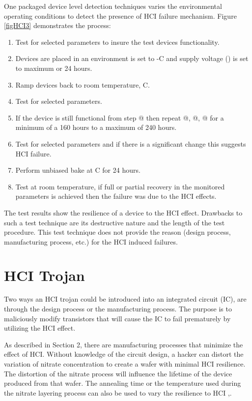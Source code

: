 \documentclass[12pt,conference]{IEEEtran}
\makeatletter
\newcommand{\Rmnum}[1]{\expandafter\@slowromancap\romannumeral #1@}
\makeatother
\begin{document}
One packaged device level detection techniques varies the environmental operating conditions to detect the presence of HCI failure mechanism.  Figure \ref{figHCI3} demonstrates the process: 
\begin{comment}
\newcounter{Lcount}
\begin{list}{\Roman{Lcount}.}
{\usecounter{Lcount}
\setlength{\rightmargin}{\leftmargin}}


\end{comment}
\renewcommand{\labelenumi}{\Roman{enumi}.}
\begin{enumerate}
\item Test for selected parameters to insure the test devices functionality.
\item Devices are placed in an environment is set to -C  and supply voltage () is set to maximum or 24 hours.
\item Ramp devices back to room temperature, C.
\item Test for selected parameters.
\item If the device is still functional from step \Rmnum{5} then repeat \Rmnum{2}, \Rmnum{3}, \Rmnum{4} for a minimum of a 160 hours to a maximum of 240 hours.
\item Test for selected parameters and if there is a significant change this suggests HCI failure.
\item Perform unbiased bake at C for 24 hours.
\item Test at room temperature, if full or partial recovery in the monitored parameters is achieved then the failure was due to the HCI effects. 
\end{enumerate}
 The test results show the resilience of a device to the HCI effect.  Drawbacks to such a test technique are its destructive nature and the length of the test procedure.  This test technique does not provide the reason (design process, manufacturing process, etc.) for  the HCI induced failures.  
 

\section*{HCI Trojan}
Two ways an HCI trojan could be introduced into an integrated circuit (IC), are through the design process or the manufacturing process.  The purpose is to maliciously modify transistors that will cause the IC to fail prematurely by utilizing the HCI effect. 


As described in Section 2, there are manufacturing processes that minimize the effect of HCI.  Without knowledge of the circuit design, a hacker can distort the variation of nitrate concentration to create a wafer with minimal HCI resilience.  The distortion of the nitrate process will influence the lifetime of the device produced from that wafer.   The annealing time or the temperature used during the nitrate layering process can also be used to vary the resilience to HCI \cite{NOX92A},\cite{IEDM95}.      
\end{document}

